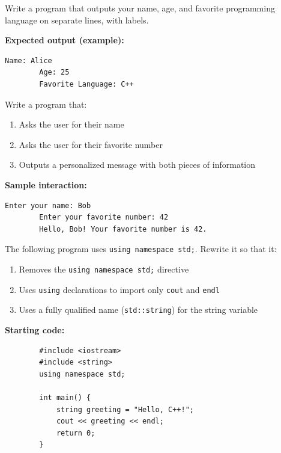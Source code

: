 \begin{example}{\leavevmode}
	
	Write a program that outputs your name, age, and favorite programming language on separate lines, with labels.
	
	\textbf{Expected output (example):}
	\begin{lstlisting}[numbers=none]
		Name: Alice
		Age: 25
		Favorite Language: C++
	\end{lstlisting}
\end{example}

\begin{example}{\leavevmode}

	Write a program that:
	\begin{enumerate}
		\item Asks the user for their name
		\item Asks the user for their favorite number
		\item Outputs a personalized message with both pieces of information
	\end{enumerate}

	\textbf{Sample interaction:}
	\begin{lstlisting}[numbers=none]
		Enter your name: Bob
		Enter your favorite number: 42
		Hello, Bob! Your favorite number is 42.
	\end{lstlisting}
\end{example}

\begin{example}{\leavevmode}

	The following program uses \texttt{using namespace std;}. Rewrite it so that it:
	\begin{enumerate}
		\item Removes the \texttt{using namespace std;} directive
		\item Uses \texttt{using} declarations to import only \texttt{cout} and \texttt{endl}
		\item Uses a fully qualified name (\texttt{std::string}) for the string variable
	\end{enumerate}

	\textbf{Starting code:}
	\begin{lstlisting}
		#include <iostream>
		#include <string>
		using namespace std;

		int main() {
			string greeting = "Hello, C++!";
			cout << greeting << endl;
			return 0;
		}
	\end{lstlisting}
\end{example}